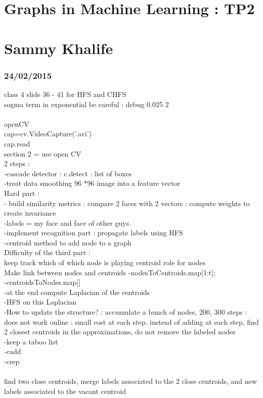 
\geometry{hmargin=2.5cm,vmargin=2cm}   


\section*{Graphs in Machine Learning : TP2}
\section*{Sammy Khalife}
\subsubsection*{24/02/2015}

class 4 slide 36 - 41 for HFS and CHFS
~\\
sogma term in exponential be careful : debug
0.025
2~\\
~\\
openCV~\\
cap=cv.VideoCapture('.avi')~\\
cap.read~\\
section 2 = use open CV~\\
2 steps :~\\
-cascade detector : c.detect : list of boxes~\\
-treat data smoothing 96 *96 image into a feature vector~\\
Hard part : ~\\
- build similarity metrics : compare 2 faces with 2 vectors : compute weights to create invariance~\\
-labels = my face and face of other guys.~\\
-implement recognition part : propagate labels using HFS~\\
-centroid method to add node to a graph~\\
Difficulty of the third part : ~\\
keep track which of which node is playing centroid role for nodes~\\
Make link between nodes and centroids
-nodesToCentroids.map[1:t];~\\
-centroidsToNodes.map[]~\\
-at the end compute Laplacian of the centroids~\\
-HFS on this Laplacian~\\
-How to update the structure? : accumulate a bunch of nodes, 200, 300 steps : does not work online : small cost at each step. instead of adding at each step, find 2 closest centroids in the approximations, do not remove the labeled nodes~\\
-keep a taboo list~\\
-cadd~\\
-crep~\\
~\\
find two close centroids, merge labels associated to the 2 close centroids, and new labels associated to the vacant centroid

